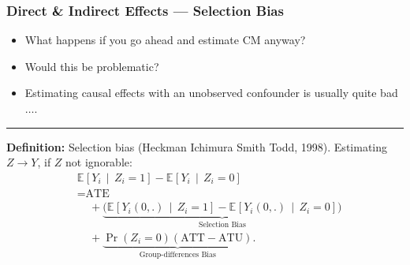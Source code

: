 \documentclass[dvipsnames,handout]{beamer} %
\newcommand{\Prob}[1]{\Pr\left( #1 \right)}                         %
\newcommand{\Egiven}[3][]{\mathbb{E}_{#1} \left[ #2 \, \middle\vert \, #3 \right]} %
\begin{document}
\begin{frame}[noframenumbering]
    \frametitle{Direct \& Indirect Effects --- Selection Bias}
    \begin{itemize}
        \item What happens if you go ahead and estimate CM anyway?
        \item Would this be problematic?
        \item Estimating causal effects with an unobserved confounder is usually quite bad$\hdots$.
    \end{itemize}
    \par\noindent\rule{\textwidth}{0.4pt}
    \vskip0.25cm
    \textbf{Definition:} Selection bias (Heckman Ichimura Smith Todd, 1998).
    \vskip0.25cm
    Estimating $Z \to Y$, if $Z$ not ignorable:
    \begin{align*}
        &\Egiven{ Y_i}{Z_i =1} - \Egiven{ Y_i}{Z_i =0} \\
        &= \text{ATE} \\
        &\;\;\;\; + \underbrace{\Big(
            \Egiven{ Y_i(0,.)}{Z_i =1} - \Egiven{ Y_i(0,.)}{Z_i =0} \Big)}_{
                \text{Selection Bias}} \\
        &\;\;\;\;+ \underbrace{ \Prob{Z_i=0} (\text{ATT}- \text{ATU}) }_{
            \text{Group-differences Bias}}.
    \end{align*}
\end{frame}
\end{document}
